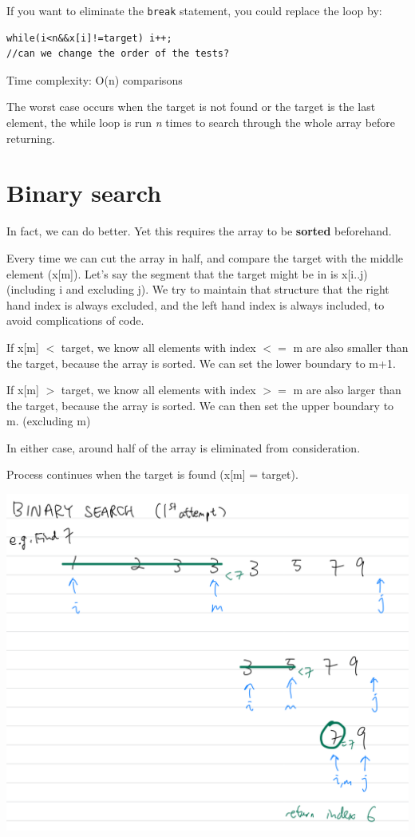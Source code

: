 If you want to eliminate the \texttt{break} statement, you could replace the loop by:

\begin{lstlisting}
while(i<n&&x[i]!=target) i++;
//can we change the order of the tests?
\end{lstlisting}

Time complexity: O(n) comparisons
\vspace{6mm}

The worst case occurs when the target is not found or the target is the last element, the while loop is run \textit{n} times to search through the whole array before returning.

\pagebreak

\section{Binary search}

In fact, we can do better. Yet this requires the array to be \textbf{sorted} beforehand.

Every time we can cut the array in half, and compare the target with the middle element (x[m]). Let's say the segment that the target might be in is x[i..j) (including i and excluding j). We try to maintain that structure that the right hand index is always excluded, and the left hand index is always included, to avoid complications of code.
\vspace{6mm}

If x[m] $<$ target, we know all elements with index $<=$ m are also smaller than the target, because the array is sorted. We can set the lower boundary to m+1.

If x[m] $>$ target, we know all elements with index $>=$ m are also larger than the target, because the array is sorted. We can then set the upper boundary to m. (excluding m)

In either case, around half of the array is eliminated from consideration.

Process continues when the target is found (x[m] = target).
\vspace{6mm}

\includegraphics[width=14cm]{images/ch7-binarysearch1.png}
\pagebreak

